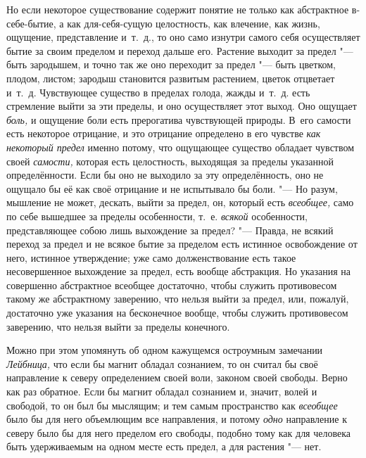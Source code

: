 Но если некоторое существование содержит понятие не только как абстрактное
в-себе-бытие, а как для-себя-сущую целостность, как влечение, как жизнь,
ощущение, представление и~т.~д., то оно само изнутри самого себя
осуществляет бытие за своим пределом и переход дальше его. Растение выходит
за предел "--- быть зародышем, и точно так же оно переходит за предел "--- быть
цветком, плодом, листом; зародыш становится развитым растением, цветок
отцветает и~т.~д. Чувствующее существо в пределах голода, жажды и~т.~д.
есть стремление выйти за эти пределы, и оно осуществляет этот выход. Оно
ощущает {\em боль,} и ощущение боли есть прерогатива
чувствующей природы. В~его самости есть некоторое отрицание, и это
отрицание определено в его чувстве {\em как некоторый
предел} именно потому, что ощущающее существо обладает чувством своей
{\em самости,} которая есть целостность, выходящая за
пределы указанной определённости. Если бы оно не выходило за эту
определённость, оно не ощущало бы её как своё отрицание и не испытывало бы
боли. "--- Но разум, мышление не может, дескать, выйти за предел, он, который
есть {\em всеобщее,} само по себе вышедшее за пределы
особенности, т.~е. {\em всякой} особенности,
представляющее собою лишь выхождение за предел? "--- Правда, не всякий переход
за предел и не всякое бытие за пределом есть истинное освобождение от него,
истинное утверждение; уже само долженствование есть такое несовершенное
выхождение за предел, есть вообще абстракция. Но указания на совершенно
абстрактное всеобщее достаточно, чтобы служить противовесом такому же
абстрактному заверению, что нельзя выйти за предел, или, пожалуй,
достаточно уже указания на бесконечное вообще, чтобы служить противовесом
заверению, что нельзя выйти за пределы конечного.

Можно при этом упомянуть об одном кажущемся остроумным замечании
{\em Лейбница,} что если бы магнит обладал сознанием,
то он считал бы своё направление к северу определением своей воли, законом
своей свободы\label{magpage}. Верно как раз
обратное. Если бы магнит обладал сознанием и, значит, волей и свободой, то
он был бы мыслящим; и тем самым пространство как
{\em всеобщее} было бы для него объемлющим все
направления, и потому {\em одно} направление к северу
было бы для него пределом его свободы, подобно тому как для человека быть
удерживаемым на одном месте есть предел, а для растения "--- нет.

